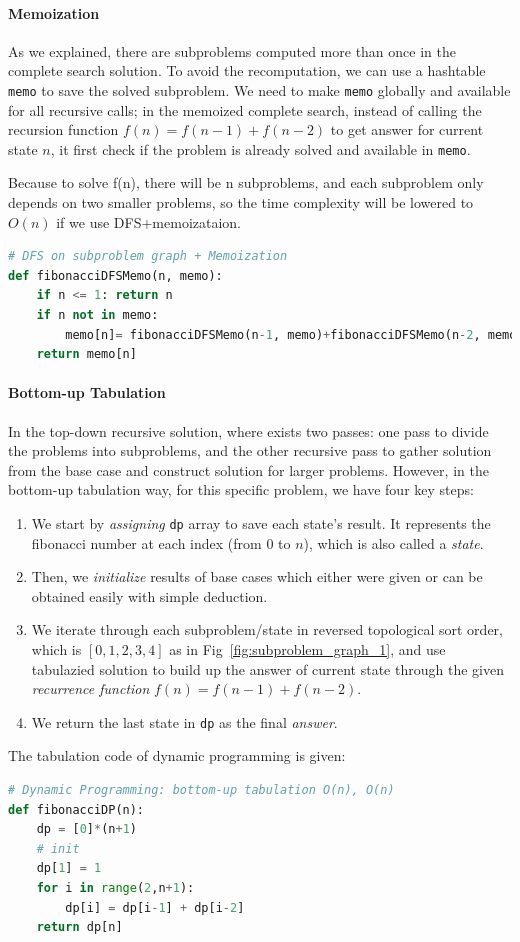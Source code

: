 \documentclass[../main.tex]{subfiles}
\begin{document}
\paragraph{Memoization} As we explained, there are subproblems computed more than once in the complete search solution. To avoid the recomputation, we can use a hashtable \texttt{memo} to save the solved subproblem. We need to make \texttt{memo} globally and available for all recursive calls; in the memoized complete search, instead of calling the recursion function $f(n) = f(n-1) + f(n-2)$ to get answer for current state $n$, it first check if the problem is already solved and available in \texttt{memo}. 

Because to solve f(n), there will be n subproblems, and each subproblem only depends on two smaller problems,  so the time complexity will be lowered to $O(n)$ if we use DFS+memoizataion. 
\begin{lstlisting}[language=Python]
# DFS on subproblem graph + Memoization
def fibonacciDFSMemo(n, memo):
    if n <= 1: return n
    if n not in memo:
        memo[n]= fibonacciDFSMemo(n-1, memo)+fibonacciDFSMemo(n-2, memo)
    return memo[n]
\end{lstlisting}

\paragraph{Bottom-up Tabulation} In the top-down recursive solution,  where exists two passes: one pass to divide the problems into subproblems, and the other recursive pass to gather solution from the base case and construct solution for larger problems. However, in the bottom-up tabulation way, for this specific problem, we have four key steps:
\begin{enumerate}
    \item We start by \textit{assigning} \texttt{dp} array to save each state's result.  It represents the fibonacci number at each  index (from 0 to $n$), which is also called a \textit{state}. 
    \item Then, we \textit{initialize} results of base cases which either were given or can be obtained easily with simple deduction. 
    \item We iterate through each subproblem/state in reversed topological sort order, which is $[0, 1, 2, 3, 4]$ as in Fig~\ref{fig:subproblem_graph_1}, and use tabulazied solution to build up the answer of current state through the given \textit{recurrence function} $f(n) = f(n-1) + f(n-2)$.  
    \item We return the last state in \texttt{dp} as the final \textit{answer}.
\end{enumerate}
The tabulation code of dynamic programming is given:
\begin{lstlisting}[language=Python]
# Dynamic Programming: bottom-up tabulation O(n), O(n)
def fibonacciDP(n):
    dp = [0]*(n+1)
    # init
    dp[1] = 1
    for i in range(2,n+1):
        dp[i] = dp[i-1] + dp[i-2]
    return dp[n]
\end{lstlisting}
\end{document}
